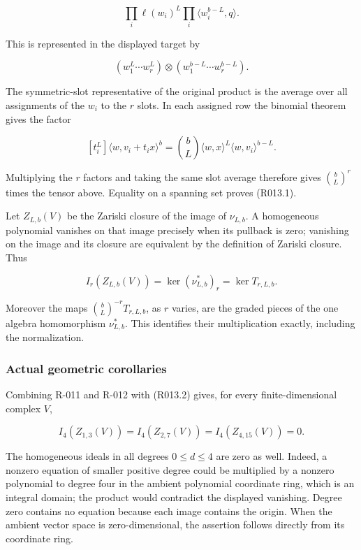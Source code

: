 \documentclass[
  10pt,
]{article}
\begin{document}
\[
 \prod_i\ell(w_i)^L
 \prod_i\langle w_i^{b-L},q\rangle.
\]

This is represented in the displayed target by

\[
 (w_1^L\cdots w_r^L)\otimes
 (w_1^{b-L}\cdots w_r^{b-L}).
\]

The symmetric-slot representative of the original product is the average
over all assignments of the \(w_i\) to the \(r\) slots. In each assigned
row the binomial theorem gives the factor

\[
 [t_i^L]\langle w,v_i+t_ix\rangle^b
 =\binom bL\langle w,x\rangle^L
 \langle w,v_i\rangle^{b-L}.
\]

Multiplying the \(r\) factors and taking the same slot average therefore
gives \(\binom bL^r\) times the tensor above. Equality on a spanning set
proves (R013.1).

Let \(Z_{L,b}(V)\) be the Zariski closure of the image of \(\nu_{L,b}\).
A homogeneous polynomial vanishes on that image precisely when its
pullback is zero; vanishing on the image and its closure are equivalent
by the definition of Zariski closure. Thus

\[
 \boxed{\displaystyle
 I_r(Z_{L,b}(V))
 =\ker(\nu_{L,b}^*)_r
 =\ker T_{r,L,b}.}
 \tag{R013.2}
\]

Moreover the maps \(\binom bL^{-r}T_{r,L,b}\), as \(r\) varies, are the
graded pieces of the one algebra homomorphism \(\nu_{L,b}^*\). This
identifies their multiplication exactly, including the normalization.

\subsubsection{Actual geometric
corollaries}\label{actual-geometric-corollaries}

Combining R-011 and R-012 with (R013.2) gives, for every
finite-dimensional complex \(V\),

\[
 I_4(Z_{1,3}(V))=
 I_4(Z_{2,7}(V))=
 I_4(Z_{4,15}(V))=0.
\]

The homogeneous ideals in all degrees \(0\le d\le4\) are zero as well.
Indeed, a nonzero equation of smaller positive degree could be
multiplied by a nonzero polynomial to degree four in the ambient
polynomial coordinate ring, which is an integral domain; the product
would contradict the displayed vanishing. Degree zero contains no
equation because each image contains the origin. When the ambient vector
space is zero-dimensional, the assertion follows directly from its
coordinate ring.
\end{document}
